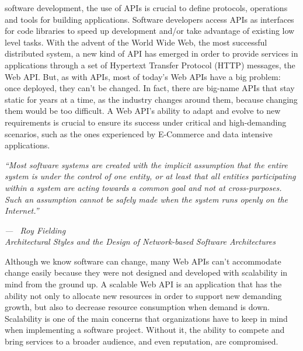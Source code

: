 \documentclass[10pt,article]{IEEEtran}
\begin{document}
% 
% 
% 
% 
 software development, the use of APIs is crucial to define protocols, operations and tools for building applications. Software developers access APIs as interfaces for code libraries to speed up development and/or take advantage of existing low level tasks. With the advent of the World Wide Web, the most successful distributed system, a new kind of API has emerged in order to provide services in applications through a set of Hypertext Transfer Protocol (HTTP) messages, the Web API. But, as with APIs, most of today's Web APIs have a big problem: once deployed, they can't be changed. In fact, there are big-name APIs that stay static for years at a time, as the industry changes around them, because changing them would be too difficult\cite{RESTfulWebAPI:richardson}. A Web API's ability to adapt and evolve to new requirements is crucial to ensure its success under critical and high-demanding scenarios, such as the ones experienced by E-Commerce and data intensive applications.

 
\epigraph{{\textit{``Most software systems are created with the implicit assumption that the entire system is under the control of one entity, or at least that all entities participating within a system are acting towards a common goal and not at cross-purposes. Such an assumption cannot be safely made when the system runs openly on the Internet.''}}}{\textit{--- ~Roy Fielding \\ Architectural Styles and the Design of Network-based Software Architectures}}

Although we know software can change, many Web APIs can't accommodate change easily because they were not designed and developed with scalability in mind from the ground up. A scalable Web API is an application that has the ability not only to allocate new resources in order to support new demanding growth, but also to decrease resource consumption when demand is down. Scalability is one of the main concerns that organizations have to keep in mind when implementing a software project. Without it, the ability to compete and bring services to a broader audience, and even reputation, are compromised.
\end{document}
